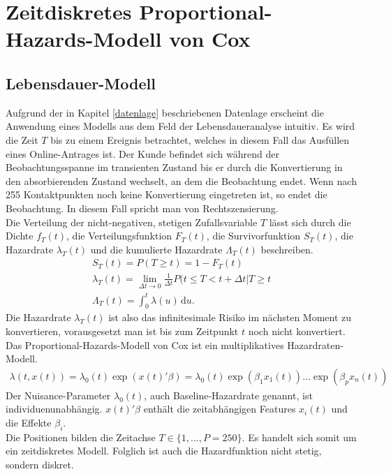\section{Zeitdiskretes Proportional-Hazards-Modell von Cox}

\subsection{Lebensdauer-Modell}

Aufgrund der  in Kapitel \ref{datenlage} beschriebenen Datenlage erscheint die Anwendung eines Modells aus dem Feld der Lebensdaueranalyse intuitiv. Es wird die Zeit $T$ bis zu einem Ereignis betrachtet, welches in diesem Fall das Ausfüllen eines Online-Antrages ist. Der Kunde befindet sich während der Beobachtungsspanne im transienten Zustand bis er durch die Konvertierung in den absorbierenden Zustand wechselt, an dem die Beobachtung endet. Wenn nach 255 Kontaktpunkten noch keine Konvertierung eingetreten ist, so endet die Beobachtung. In diesem Fall spricht man von Rechtszensierung.\\
Die Verteilung der nicht-negativen, stetigen Zufallsvariable $T$ lässt sich durch die Dichte $f_T(t)$, die Verteilungsfunktion $F_T(t)$, die Survivorfunktion $S_T(t)$, die Hazardrate $\lambda_T(t)$ und die kumulierte Hazardrate $\Lambda_T(t)$ beschreiben.
\begin{align}
	S_T(t) = P(T \geq t) = 1 - F_T(t)\\
	\lambda_T(t) = \lim\limits_{\Delta t \rightarrow 0}{\frac{1}{\Delta t}P(t\leq T < t + \Delta t |T \geq t} \\
	\Lambda_T(t) = \int_0^t \! \lambda(u) \, \mathrm{d}u. 
\end{align}
Die Hazardrate $\lambda_T(t)$ ist also das infinitesimale Risiko im nächsten Moment zu konvertieren, vorausgesetzt man ist bis zum Zeitpunkt $t$ noch nicht konvertiert.\\
Das Proportional-Hazards-Modell von Cox \cite{cox} ist ein multiplikatives Hazardraten-Modell.
\begin{align}
	\lambda(t,x(t)) = \lambda_0(t)\exp(x(t)'\beta) = \lambda_0(t)\exp(\beta_1 x_1(t))...\exp(\beta_p x_n(t))
\end{align}
Der Nuisance-Parameter $\lambda_0(t)$, auch Baseline-Hazardrate genannt, ist individuenunabhängig. $x(t)'\beta$ enthält die zeitabhängigen Features $x_i(t)$ und die Effekte $\beta_i$.\\
Die Positionen bilden die Zeitachse $T \in \{1,...,P=250\}$. Es handelt sich somit um ein zeitdiskretes Modell. Folglich ist auch die Hazardfunktion nicht stetig, sondern diskret.
